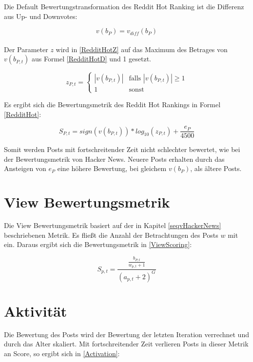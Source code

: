 Die Default Bewertungstransformation des Reddit Hot Ranking ist die Differenz aus Up- und Downvotes:

\begin{equation}
\label{RedditHotD}
v(b_{P}) = v_{diff}(b_{P})
\end{equation}
\\
Der Parameter $z$ wird in \ref{RedditHotZ} auf das Maximum des Betrages von $v(b_{P,t})$ aus Formel \ref{RedditHotD} und 1 gesetzt.

\begin{equation}
\label{RedditHotZ}
z_{P,t}  = \begin{cases}
|v(b_{P,t})| &\text{falls $|v(b_{P,t})| \geq 1$}\\
1 &\text{sonst}
\end{cases}
\end{equation}

Es ergibt sich die Bewertungsmetrik des Reddit Hot Rankings in Formel \ref{RedditHot}:

\begin{equation}
\label{RedditHot}
S_{P,t} = sign(v(b_{P,t})) * log_{10}(z_{P,t}) + \frac{e_{P}}{4500}
\end{equation}

Somit werden Posts mit fortschreitender Zeit nicht schlechter bewertet, wie bei der Bewertungsmetrik von Hacker News. Neuere Posts erhalten durch das Ansteigen von $e_P$ eine höhere Bewertung, bei gleichem $v(b_P)$, als ältere Posts. 
 

\section{View Bewertungsmetrik}

Die View Bewertungsmetrik basiert auf der in Kapitel \ref{seqvHackerNews} beschriebenen Metrik. Es fließt die Anzahl der Betrachtungen des Posts $w$ mit ein. Daraus ergibt sich die Bewertungsmetrik in \ref{ViewScoring}:

\begin{equation}
\label{ViewScoring}
S_{p,t} = \frac{\frac{b_{P,t}}{w_{p,t} + 1}}{(a_{p,t} + 2)^{G}}
\end{equation}

\section{Aktivität}

Die Bewertung des Posts wird der Bewertung der letzten Iteration verrechnet und durch das Alter skaliert. Mit fortschreitender Zeit verlieren Posts in dieser Metrik an Score, so ergibt sich in \ref{Activation}:

